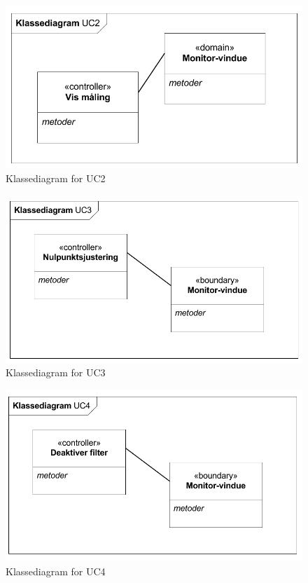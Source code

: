\begin{figure}[H]
	\centering
	\includegraphics[width=1\textwidth]{Figurer/Snip20151104_38}
	\caption{Klassediagram for UC2}
\end{figure}

\begin{figure}[H]
	\centering
	\includegraphics[width=1\textwidth]{Figurer/Snip20151104_39}
	\caption{Klassediagram for UC3}
\end{figure}

\begin{figure}[H]
	\centering
	\includegraphics[width=1\textwidth]{Figurer/Snip20151104_40}
	\caption{Klassediagram for UC4}
\end{figure}

